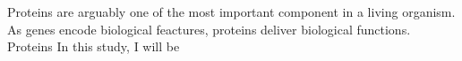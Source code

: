 Proteins are arguably one of the most important component in a living organism. As genes encode biological feactures, proteins deliver biological functions. Proteins  In this study, I will be 